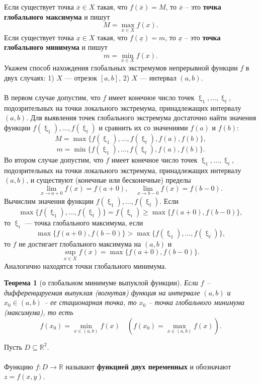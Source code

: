 \documentclass[a4paper, 12pt]{report}
\numberwithin{equation}{section}
\renewcommand{\geq}{\geqslant}
\renewcommand{\xi}{\upxi}
\newtheorem*{theorem}{Теорема}
\begin{document}
	\\\\
	{Если существует точка $\overline x\in X$ такая, что $f(\overline x) = M$, то $\overline x$ -- это \textbf{точка глобального максимума} и пишут $$M = \underset{x \in X}{\max} f(x).$$
	Если существует точка $\underline x\in X$ такая, что $f(\underline x) = m$, то $\underline x$ -- это \textbf{точка глобального минимума} и пишут} $$m = \underset{x \in X}{\min} f(x).$$
	Укажем способ нахождения глобальных экстремумов непрерывной функции $f$ в двух случаях: 1) $X$ — отрезок $[a, b]$, 2) $X$ — интервал $(a, b)$.
	\\\\
	В первом случае допустим, что $f$ имеет конечное число точек $\xi_1, \dots, \xi_l$, подозрительных на точки локального экстремума, принадлежащих интервалу $(a, b)$. Для выявления точек глобального экстремума достаточно найти значения функции $f(\xi_1), \dots, f(\xi_l)$ и сравнить их со значениями $f(a)$ и $f(b)$:
	\[
	M = \max\{f(\xi_1), \dots, f(\xi_l), f(a), f(b)\},
	\]
	\[
	m = \min\{f(\xi_1), \dots, f(\xi_l), f(a), f(b)\}.
	\]
	Во втором случае допустим, что $f$ имеет конечное число точек $\xi_1, \dots, \xi_l$, подозрительных на точки локального экстремума, принадлежащих интервалу $(a, b)$, и существуют (конечные или бесконечные) пределы
	\[
	\lim_{x \to a+0} f(x) = f(a + 0), \quad \lim_{x \to b-0} f(x) = f(b - 0).
	\]
	Вычислим значения функции $f(\xi_1), \dots, f(\xi_l)$. Если
	\[
	\max\{f(\xi_1), \dots, f(\xi_l)\} = f(\xi_i) \geq \max\{f(a + 0), f(b - 0)\},
	\]
	то $\xi_i$ — точка глобального максимума, если
	\[
	\max\{f(a + 0), f(b - 0)\} > \max\{f(\xi_1), \dots, f(\xi_l)\},
	\]
	то $f$ не достигает глобального максимума на $(a, b)$ и
	\[
	\sup_{x \in X} f(x) = \max\{f(a + 0), f(b - 0)\}.
	\]
	Аналогично находятся точки глобального минимума.
	\begin{theorem}
		[о глобальном минимуме выпуклой функции]
		Если $f$ -- дифференцируемая выпуклая (вогнутая) функция на интервале $(a,b)$ и $x_0 \in (a,b)$ -- ее стационарная точка, то $x_0$ -- точка глобального минимума (максимума), то есть 
		$$f(x_0) = \underset{x \in (a,b)}{\min}f(x)\quad (f(x_0) = \underset{x \in (a,b)}{\max}f(x)).$$
	\end{theorem}
	\noindent
	Пусть $D\subseteq\mathbb R^2$. 
	\\\\
	{Функцию $f:D \to \mathbb R$ называют \textbf{функцией двух переменных} и обозначают $z = f(x,y)$.}
	\\\\
\end{document}
